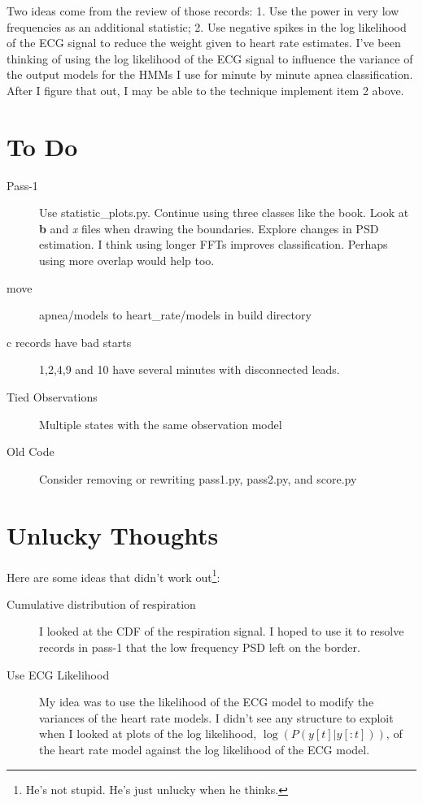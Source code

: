 \documentclass[12pt]{article}
\begin{document}
Two ideas come from the review of those records: 1. Use the power in
very low frequencies as an additional statistic; 2. Use negative
spikes in the log likelihood of the ECG signal to reduce the weight
given to heart rate estimates.  I've been thinking of using the log
likelihood of the ECG signal to influence the variance of the output
models for the HMMs I use for minute by minute apnea classification.
After I figure that out, I may be able to the technique implement item
2 above.


\section{To Do}
\label{sec:todo}

\begin{description}
\item[Pass-1] Use statistic_plots.py.  Continue using three classes
  like the book.  Look at \textbf{b} and \emph{x} files when drawing
  the boundaries.  Explore changes in PSD estimation.  I think using
  longer FFTs improves classification.  Perhaps using more overlap
  would help too.
\item[move] apnea/models to heart\_rate/models in build directory
\item[c records have bad starts] 1,2,4,9 and 10 have several minutes
  with disconnected leads.
\item[Tied Observations] Multiple states with the same observation
  model
\item[Old Code] Consider removing or rewriting pass1.py, pass2.py, and
  score.py 
\end{description}

\section{Unlucky Thoughts}
\label{sec:unlucky}

Here are some ideas that didn't work out\footnote{He's not stupid.
  He's just unlucky when he thinks.}:
\begin{description}
\item[Cumulative distribution of respiration] I looked at the CDF of
  the respiration signal.  I hoped to use it to resolve records in
  pass-1 that the low frequency PSD left on the border.
\item[Use ECG Likelihood] My idea was to use the likelihood of the ECG
  model to modify the variances of the heart rate models.  I didn't
  see any structure to exploit when I looked at plots of the log
  likelihood, $\log\left(P(y[t]|y[:t]) \right)$, of the heart rate
  model against the log likelihood of the ECG model.
\end{description}
\end{document}
